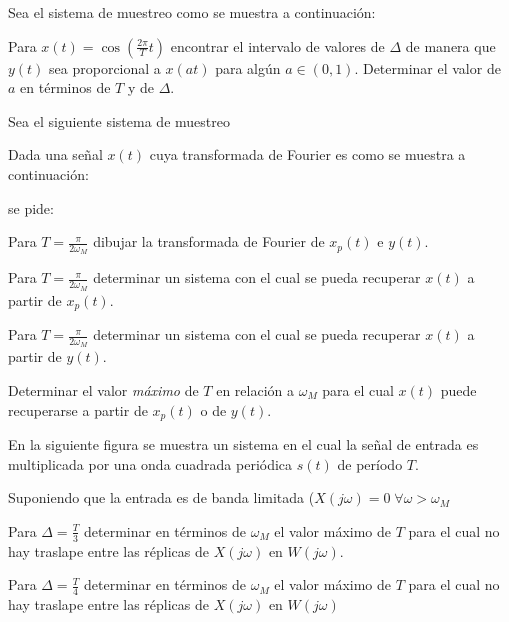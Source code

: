     \begin{ejercicio}
    Sea el sistema de muestreo como se muestra a continuación:
    \begin{center}
    
    \end{center}
    Para $x(t)=\cos\left(\frac{2\pi}{T}t\right)$ encontrar el intervalo de valores de $\Delta$ de manera que $y(t)$ sea proporcional a $x(at)$ para algún $a\in(0,1)$. Determinar el valor de $a$ en términos de $T$ y de $\Delta$.
    \end{ejercicio}
    
    \begin{ejercicio}
    Sea el siguiente sistema de muestreo
    \begin{center}
    
    \end{center}
    Dada una señal $x(t)$ cuya transformada de Fourier es como se muestra a continuación:
    \begin{center}
    
    \end{center}
    se pide:
    
    \inciso Para $T=\frac{\pi}{2\omega_M}$ dibujar la transformada de Fourier de $x_p(t)$ e $y(t)$.
    
    \inciso Para $T=\frac{\pi}{2\omega_M}$ determinar un sistema con el cual se pueda recuperar $x(t)$ a partir de $x_p(t)$.
    
    \inciso Para $T=\frac{\pi}{2\omega_M}$ determinar un sistema con el cual se pueda recuperar $x(t)$ a partir de $y(t)$.
    
    \inciso Determinar el valor \emph{máximo} de $T$ en relación a $\omega_M$ para el cual $x(t)$ puede recuperarse a partir de $x_p(t)$ o de $y(t)$.
    
    \end{ejercicio}
    
    \begin{ejercicio}
    En la siguiente figura se muestra un sistema en el cual la señal de entrada es multiplicada por una onda cuadrada periódica $s(t)$ de período $T$. 
    \begin{center}
    
    \end{center}
    Suponiendo que la entrada es de banda limitada ($X(j\omega)=0\; \forall \omega>\omega_M$
    
    \inciso Para $\Delta=\frac{T}{3}$ determinar en términos de $\omega_M$ el valor máximo de $T$ para el cual no hay traslape entre las réplicas de $X(j\omega)$ en $W(j\omega)$.
    
    \inciso Para $\Delta=\frac{T}{4}$ determinar en términos de $\omega_M$ el valor máximo de $T$ para el cual no hay traslape entre las réplicas de $X(j\omega)$ en $W(j\omega)$
    \end{ejercicio}
    
